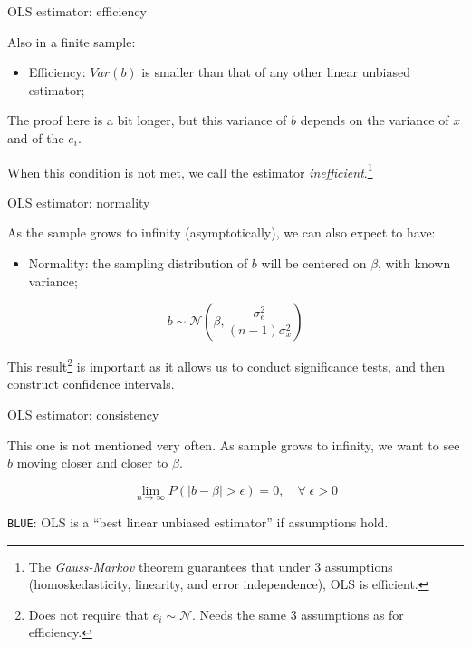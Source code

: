 \documentclass[12pt,english,pdf,xcolor=dvipsnames,aspectratio=169,handout]{beamer}\usepackage[]{graphicx}\usepackage[]{xcolor}
\begin{document}
\begin{frame}{OLS estimator: efficiency}

Also in a finite sample:

\begin{itemize}
  \item Efficiency: $Var(b)$ is smaller than that of any other linear unbiased estimator;
\end{itemize}\bigskip

The proof here is a bit longer, but this variance of $b$ depends on the variance of $x$ and of the $e_i$.\bigskip

When this condition is not met, we call the estimator \textit{inefficient}.\footnote{The \textit{Gauss-Markov} theorem guarantees that under 3 assumptions (homoskedasticity, linearity, and error independence), OLS is efficient.}

\end{frame}



\begin{frame}{OLS estimator: normality}

As the sample grows to infinity (asymptotically), we can also expect to have:

\begin{itemize}
  \item Normality: the sampling distribution of $b$ will be centered on $\beta$, with known variance;
\end{itemize}\bigskip

\begin{equation}
b \sim \mathcal{N}\left(\beta, \frac{\sigma_e^2}{(n-1)\sigma_x^2}\right)
\end{equation}

This result\footnote{Does not require that $e_i \sim \mathcal{N}$. Needs the same 3 assumptions as for efficiency.} is important as it allows us to conduct significance tests, and then construct confidence intervals.

\end{frame}



\begin{frame}{OLS estimator: consistency}

This one is not mentioned very often. As sample grows to infinity, we want to see $b$ moving closer and closer to $\beta$.

\begin{equation}
\lim_{n\to\infty} P(|b - \beta|>\epsilon)=0,\quad \forall\; \epsilon > 0
\end{equation}

\texttt{BLUE}: OLS is a ``best linear unbiased estimator'' if assumptions hold.

\end{frame}
\end{document}
